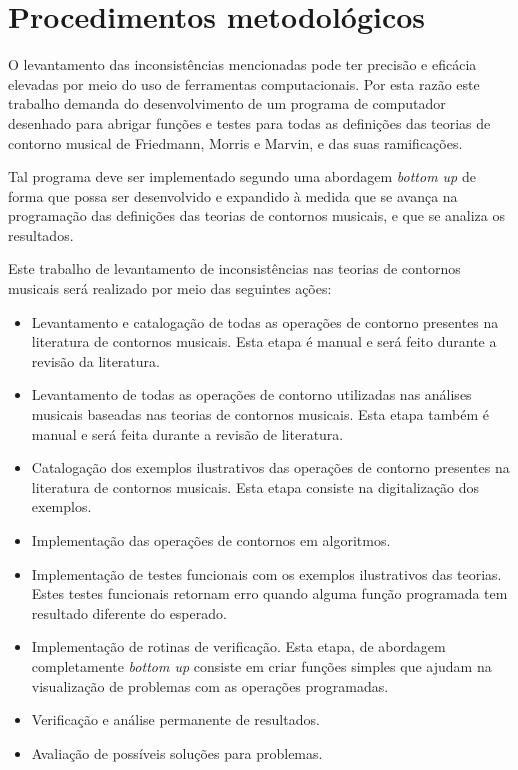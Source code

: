 \documentclass[12pt]{article}
\newcommand{\eng}[1]{\textit{#1}}
\begin{document}
\section{Procedimentos metodológicos}
\label{sec:metodologia}

O levantamento das inconsistências mencionadas pode ter precisão e
eficácia elevadas por meio do uso de ferramentas computacionais. Por
esta razão este trabalho demanda do desenvolvimento de um programa de
computador desenhado para abrigar funções e testes para todas as
definições das teorias de contorno musical de Friedmann, Morris e
Marvin, e das suas ramificações.

Tal programa deve ser implementado segundo uma abordagem \eng{bottom
  up} \cite{graham94:lisp} de forma que possa ser desenvolvido e
expandido à medida que se avança na programação das definições das
teorias de contornos musicais, e que se analiza os resultados.

Este trabalho de levantamento de inconsistências nas teorias de
contornos musicais será realizado por meio das seguintes ações:

\begin{itemize}
\item Levantamento e catalogação de todas as operações de contorno
  presentes na literatura de contornos musicais. Esta etapa é manual e
  será feito durante a revisão da literatura.
\item Levantamento de todas as operações de contorno utilizadas nas
  análises musicais baseadas nas teorias de contornos musicais. Esta
  etapa também é manual e será feita durante a revisão de literatura.
\item Catalogação dos exemplos ilustrativos das operações de contorno
  presentes na literatura de contornos musicais. Esta etapa consiste
  na digitalização dos exemplos.
\item Implementação das operações de contornos em algoritmos.
\item Implementação de testes funcionais com os exemplos ilustrativos
  das teorias. Estes testes funcionais retornam erro quando alguma
  função programada tem resultado diferente do esperado.
\item Implementação de rotinas de verificação. Esta etapa, de
  abordagem completamente \eng{bottom up} consiste em criar funções
  simples que ajudam na visualização de problemas com as operações
  programadas.
\item Verificação e análise permanente de resultados.
\item Avaliação de possíveis soluções para problemas.
\end{itemize}
\end{document}
